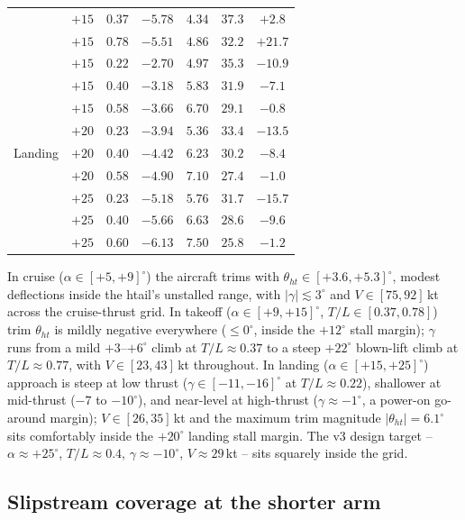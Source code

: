 \documentclass[conf]{new-aiaa}
\begin{document}
\begin{table}[htb!]
\begin{tabular}{ccccccc}
  & $+15$ & $0.37$ & $-5.78$ & $4.34$ & $37.3$ & $+2.8$  \\
  & $+15$ & $0.78$ & $-5.51$ & $4.86$ & $32.2$ & $+21.7$ \\
\midrule
\multirow{9}{*}{Landing}
  & $+15$ & $0.22$ & $-2.70$ & $4.97$ & $35.3$ & $-10.9$ \\
  & $+15$ & $0.40$ & $-3.18$ & $5.83$ & $31.9$ & $-7.1$  \\
  & $+15$ & $0.58$ & $-3.66$ & $6.70$ & $29.1$ & $-0.8$  \\
  & $+20$ & $0.23$ & $-3.94$ & $5.36$ & $33.4$ & $-13.5$ \\
  & $+20$ & $0.40$ & $-4.42$ & $6.23$ & $30.2$ & $-8.4$  \\
  & $+20$ & $0.58$ & $-4.90$ & $7.10$ & $27.4$ & $-1.0$  \\
  & $+25$ & $0.23$ & $-5.18$ & $5.76$ & $31.7$ & $-15.7$ \\
  & $+25$ & $0.40$ & $-5.66$ & $6.63$ & $28.6$ & $-9.6$  \\
  & $+25$ & $0.60$ & $-6.13$ & $7.50$ & $25.8$ & $-1.2$  \\
\bottomrule
\end{tabular}
\end{table}

In cruise ($\alpha\in[+5,+9]^\circ$) the aircraft trims with
$\theta_{ht}\in[+3.6,+5.3]^\circ$, modest deflections inside
the htail's unstalled range, with $|\gamma|\lesssim 3^\circ$
and $V\in[75,92]\,$kt across the cruise-thrust grid.  In
takeoff ($\alpha\in[+9,+15]^\circ$, $T/L\in[0.37,0.78]$) trim
$\theta_{ht}$ is mildly negative everywhere ($\le 0^\circ$,
inside the $+12^\circ$ stall margin); $\gamma$ runs from a
mild $+3$--$+6^\circ$ climb at $T/L\approx 0.37$ to a steep
$+22^\circ$ blown-lift climb at $T/L\approx 0.77$, with
$V\in[23,43]\,$kt throughout.  In landing
($\alpha\in[+15,+25]^\circ$) approach is steep at low thrust
($\gamma\in[-11,-16]^\circ$ at $T/L\approx 0.22$), shallower
at mid-thrust ($-7$ to $-10^\circ$), and near-level at
high-thrust ($\gamma\approx -1^\circ$, a power-on go-around
margin); $V\in[26,35]\,$kt and the maximum trim magnitude
$|\theta_{ht}|=6.1^\circ$ sits comfortably inside the
$+20^\circ$ landing stall margin.  The v3 design target --
$\alpha\approx +25^\circ$, $T/L\approx 0.4$,
$\gamma\approx -10^\circ$, $V\approx 29\,$kt -- sits squarely
inside the grid.

\subsection{Slipstream coverage at the shorter arm}
\end{document}

